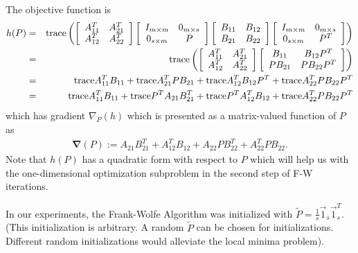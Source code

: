\documentclass[12pt,oneside,final]{thesis}
\begin{document}
The objective function is
\begin{eqnarray*}  h(P)  & =  &   \textup{trace} \left (
\left [  \begin{array}{cc}  A^T_{11} & A^T_{21} \\ A^T_{12} & A^T_{22}  \end{array} \right ]
\left [  \begin{array}{cc}  I_{m \times m} & 0_{m \times s}
\\ 0_{s \times m} & P  \end{array} \right ]
\left [  \begin{array}{cc}  B_{11} & B_{12} \\ B_{21} & B_{22}  \end{array} \right ]
\left [  \begin{array}{cc}  I_{m \times m} & 0_{m \times s}
\\ 0_{s \times m} & P^T  \end{array} \right ]
\right ) \\
& = & \textup{trace} \left (
\left [  \begin{array}{cc}  A^T_{11} & A^T_{21} \\ A^T_{12} & A^T_{22}  \end{array} \right ]
\left [  \begin{array}{cc}  B_{11} & B_{12}P^T \\ PB_{21} & PB_{22}P^T  \end{array} \right ]
\right )\\
& = & \textup{trace} A_{11}^TB_{11}+ \textup{trace} A_{21}^TPB_{21}+\textup{trace} A_{12}^TB_{12}P^T
+ \textup{trace} A_{22}^TPB_{22}P^T \\
& = &  \textup{trace} A_{11}^TB_{11}+ \textup{trace} P^T A_{21}B_{21}^T+\textup{trace} P^TA_{12}^TB_{12}
+ \textup{trace} A_{22}^TPB_{22}P^T
\end{eqnarray*}
which has gradient $\nabla_{P}(h)$ which is presented  as a matrix-valued function of $P$ as 
\begin{eqnarray*}
\boldsymbol{\nabla}(P):=A_{21}B_{21}^T+A_{12}^TB_{12}+A_{22}PB_{22}^T+A_{22}^TPB_{22} .
\end{eqnarray*} Note that $h(P)$ has a quadratic form with respect to $P$ which will help us with the one-dimensional optimization subproblem in the second step of F-W iterations.


In our experiments,  the Frank-Wolfe Algorithm was initialized with
$\tilde{P}=\frac{1}{s}\vec{1}_{s} \vec{1}_{s}^T$. (This initialization is arbitrary. A random $\tilde{P}$ can be chosen for initializations. Different random initializations would alleviate the local minima problem). 
\end{document}

